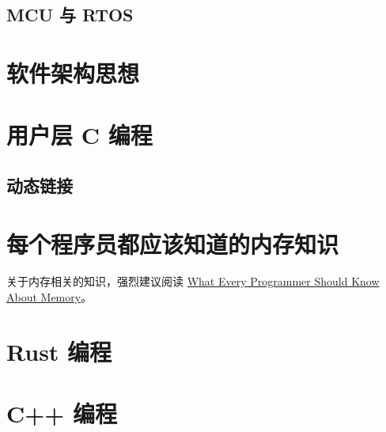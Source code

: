 \subsection{MCU 与 RTOS}

\section{软件架构思想}

\section{用户层 C 编程}
\subsection{动态链接}

\section{每个程序员都应该知道的内存知识}

关于内存相关的知识，强烈建议阅读
\href{https://people.freebsd.org/~lstewart/articles/cpumemory.pdf}{What Every Programmer Should Know About Memory}。

\section{Rust 编程}

\section{C++ 编程}

